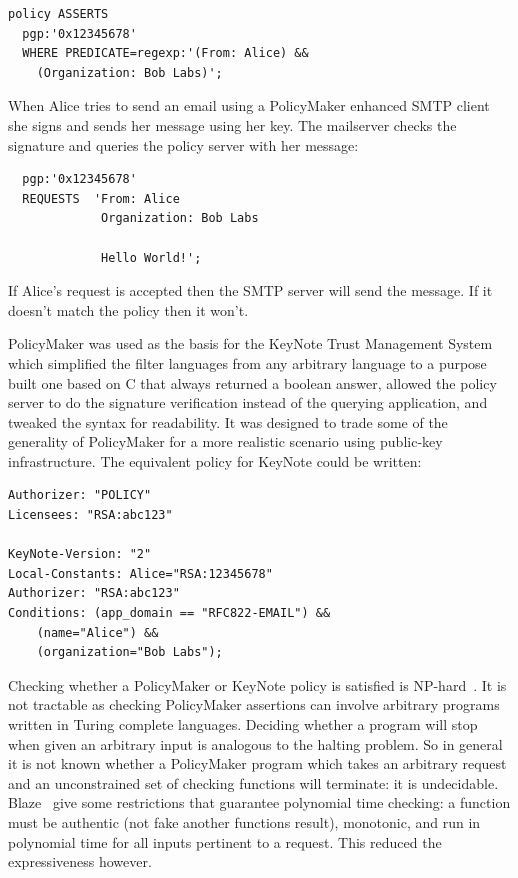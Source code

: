 \documentclass[thesis.tex]{subfiles}
\begin{document}
\begin{lstlisting}
policy ASSERTS
  pgp:'0x12345678'
  WHERE PREDICATE=regexp:'(From: Alice) &&
    (Organization: Bob Labs)';
\end{lstlisting}

When Alice tries to send an email using a PolicyMaker enhanced SMTP
client she signs and sends her message using her key.  The mailserver
checks the signature and queries the policy server with her message:

\begin{lstlisting}
  pgp:'0x12345678'
  REQUESTS  'From: Alice
             Organization: Bob Labs

             Hello World!';
\end{lstlisting}

If Alice's request is accepted then the SMTP server will send the
message.  If it doesn't match the policy then it won't.

PolicyMaker was used as the basis for the KeyNote Trust Management
System~\cite{blaze_role_1999,blaze_keynote:_1998} which simplified the
filter languages from any arbitrary language to a purpose built one
based on C that always returned a boolean answer, allowed the policy
server to do the signature verification instead of the querying
application, and tweaked the syntax for readability.  It was designed
to trade some of the generality of PolicyMaker for a more realistic
scenario using public-key infrastructure.  The equivalent policy for KeyNote could be written:

\begin{lstlisting}
Authorizer: "POLICY"
Licensees: "RSA:abc123"

KeyNote-Version: "2"
Local-Constants: Alice="RSA:12345678" 
Authorizer: "RSA:abc123"
Conditions: (app_domain == "RFC822-EMAIL") &&
    (name="Alice") &&
    (organization="Bob Labs");
\end{lstlisting}

Checking whether a PolicyMaker or KeyNote policy is satisfied is
NP-hard~\cite{blaze_compliance_1998}.  It is not tractable as checking
PolicyMaker assertions can involve arbitrary programs written in
Turing complete languages.  Deciding whether a program will stop when
given an arbitrary input is analogous to the halting problem.  So in
general it is not known whether a PolicyMaker program which takes an
arbitrary request and an unconstrained set of checking functions will
terminate: it is undecidable.  Blaze~\etal{} give
some restrictions that guarantee polynomial time checking: a function
must be authentic (not fake another functions result), monotonic, and
run in polynomial time for all inputs pertinent to a request.  This
reduced the expressiveness however.
\end{document}
